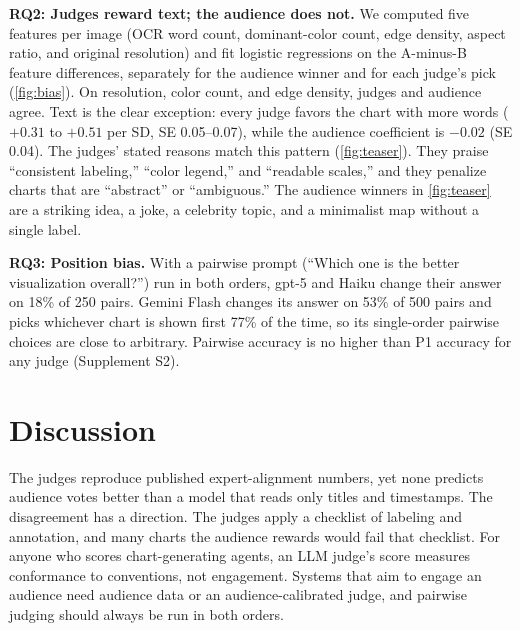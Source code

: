 \documentclass{vgtc}
\begin{document}
\textbf{RQ2: Judges reward text; the audience does not.} We computed five features per image (OCR word count, dominant-color count, edge density, aspect ratio, and original resolution) and fit logistic regressions on the A-minus-B feature differences, separately for the audience winner and for each judge's pick (\cref{fig:bias}). On resolution, color count, and edge density, judges and audience agree. Text is the clear exception: every judge favors the chart with more words ($+0.31$ to $+0.51$ per SD, SE 0.05--0.07), while the audience coefficient is $-0.02$ (SE 0.04). The judges' stated reasons match this pattern (\cref{fig:teaser}). They praise ``consistent labeling,'' ``color legend,'' and ``readable scales,'' and they penalize charts that are ``abstract'' or ``ambiguous.'' The audience winners in \cref{fig:teaser} are a striking idea, a joke, a celebrity topic, and a minimalist map without a single label.

\textbf{RQ3: Position bias.} With a pairwise prompt (``Which one is the better visualization overall?'') run in both orders, gpt-5 and Haiku change their answer on 18\% of 250 pairs. Gemini Flash changes its answer on 53\% of 500 pairs and picks whichever chart is shown first 77\% of the time, so its single-order pairwise choices are close to arbitrary. Pairwise accuracy is no higher than P1 accuracy for any judge (Supplement S2).

\section{Discussion}
The judges reproduce published expert-alignment numbers, yet none predicts audience votes better than a model that reads only titles and timestamps. The disagreement has a direction. The judges apply a checklist of labeling and annotation, and many charts the audience rewards would fail that checklist. For anyone who scores chart-generating agents, an LLM judge's score measures conformance to conventions, not engagement. Systems that aim to engage an audience need audience data or an audience-calibrated judge, and pairwise judging should always be run in both orders.
\end{document}
